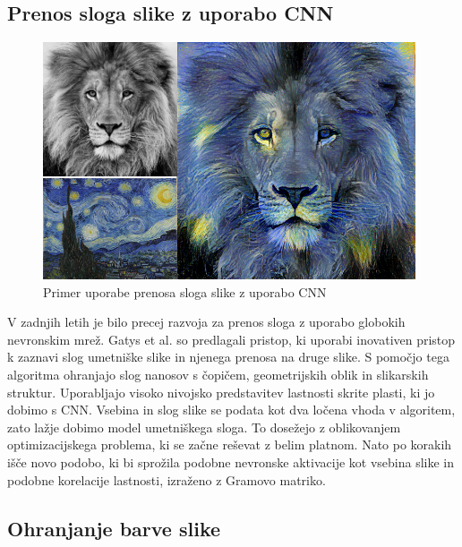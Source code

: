 \documentclass[runningheads,a4paper]{llncs}
\begin{document}
\subsection{Prenos sloga slike z uporabo CNN}
\label{sub:prenos_sloga}

\begin{figure}
\centering
\includegraphics[width=110mm]{figures/prenos_sloga.png}
\caption{Primer uporabe prenosa sloga slike z uporabo CNN}
\label{fig:prenos_sloga}
\end{figure}

V zadnjih letih je bilo precej razvoja za prenos sloga z uporabo globokih nevronskim mrež. Gatys et al. \cite{prenos_sloga} so predlagali pristop, ki uporabi inovativen pristop k zaznavi slog umetniške slike in njenega prenosa na druge slike. S pomočjo tega algoritma ohranjajo slog nanosov s čopičem, geometrijskih oblik in slikarskih struktur. Uporabljajo visoko nivojsko predstavitev lastnosti skrite plasti, ki jo dobimo s CNN. Vsebina in slog slike se podata kot dva ločena vhoda v algoritem, zato lažje dobimo model umetniškega sloga. To dosežejo z oblikovanjem optimizacijskega problema, ki se začne reševat z belim platnom. Nato po korakih išče novo podobo, ki bi sprožila podobne nevronske aktivacije kot vsebina slike in podobne korelacije lastnosti, izraženo z Gramovo matriko.

\subsection{Ohranjanje barve slike}
\end{document}
